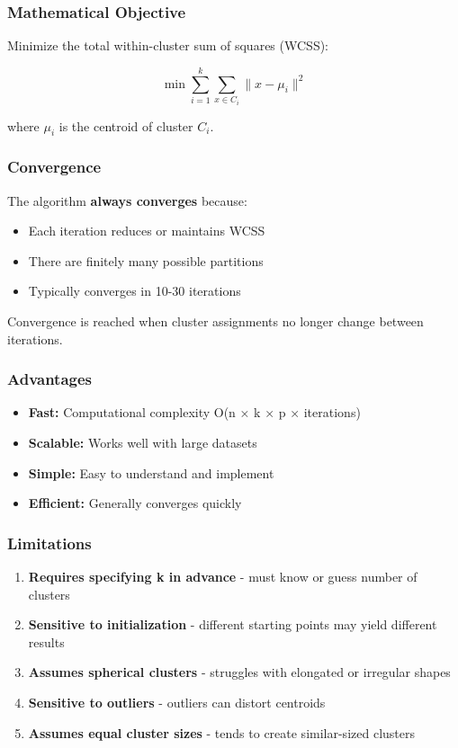\documentclass[
]{article}
\begin{document}
\subsubsection{Mathematical Objective}

Minimize the total within-cluster sum of squares (WCSS):

\[\min\sum_{i = 1}^{k}\sum_{x \in C_{i}}\| x - \mu_{i}\|^{2}\]

where \(\mu_{i}\) is the centroid of cluster \(C_{i}\).

\subsubsection{Convergence}

The algorithm \textbf{always converges} because:

\begin{itemize}
\item
  Each iteration reduces or maintains WCSS
\item
  There are finitely many possible partitions
\item
  Typically converges in 10-30 iterations
\end{itemize}

Convergence is reached when cluster assignments no longer change between
iterations.

\subsubsection{Advantages}

\begin{itemize}
\item
  \textbf{Fast:} Computational complexity O(n × k × p × iterations)
\item
  \textbf{Scalable:} Works well with large datasets
\item
  \textbf{Simple:} Easy to understand and implement
\item
  \textbf{Efficient:} Generally converges quickly
\end{itemize}

\subsubsection{Limitations}

\begin{enumerate}
\item
  \textbf{Requires specifying k in advance} - must know or guess number
  of clusters
\item
  \textbf{Sensitive to initialization} - different starting points may
  yield different results
\item
  \textbf{Assumes spherical clusters} - struggles with elongated or
  irregular shapes
\item
  \textbf{Sensitive to outliers} - outliers can distort centroids
\item
  \textbf{Assumes equal cluster sizes} - tends to create similar-sized
  clusters
\end{enumerate}
\end{document}

